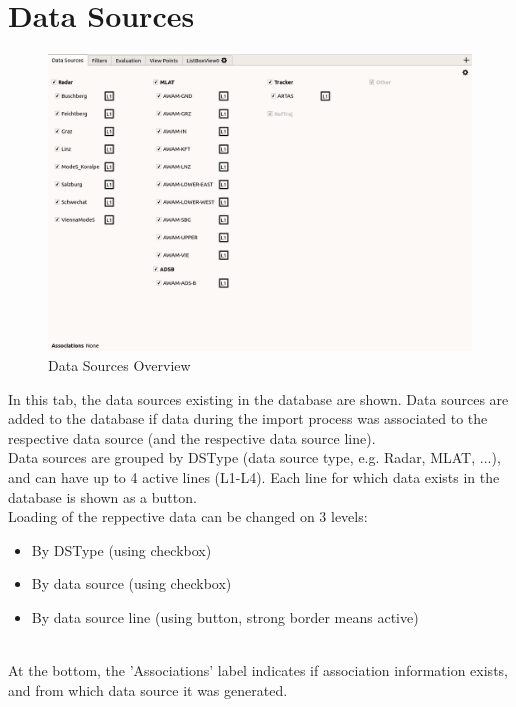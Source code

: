 \section{Data Sources}
\label{sec:ui_data_sources}

\begin{figure}[H]
    \hspace*{-2.5cm}
    \includegraphics[width=19cm,frame]{figures/ui_data_sources.png}
  \caption{Data Sources Overview}
\end{figure}

In this tab, the data sources existing in the database are shown. Data sources are added to the database if data during the import process was associated to the respective data source (and the respective data source line). \\

Data sources are grouped by DSType (data source type, e.g. Radar, MLAT, ...), and can have up to 4 active lines (L1-L4). Each line for which data exists in the database is shown as a button. \\

Loading of the reppective data can be changed on 3 levels:

\begin{itemize}
 \item By DSType (using checkbox)
 \item By data source (using checkbox)
 \item By data source line (using button, strong border means active)
\end{itemize}
\  \\

At the bottom, the 'Associations' label indicates if association information exists, and from which data source it was generated. 
